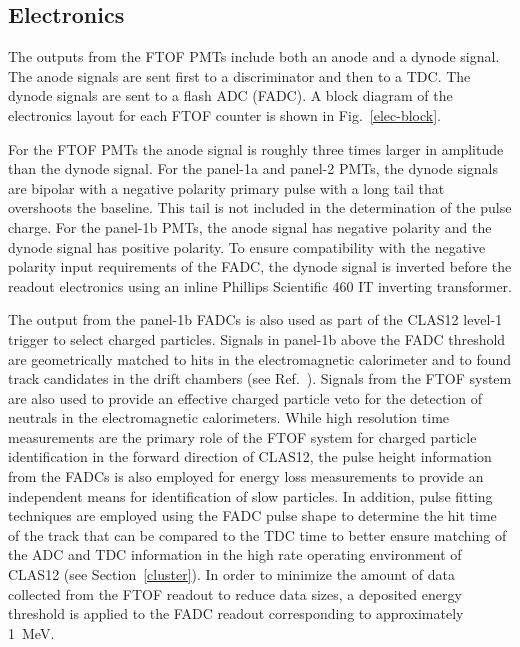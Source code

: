 \documentclass[3p,times,twocolumn]{elsarticle}
\begin{document}
\subsection{Electronics}
\label{sec-elec}

The outputs from the FTOF PMTs include both an anode and a dynode signal. The anode signals are sent
first to a discriminator and then to a TDC. The dynode signals are sent to a flash ADC (FADC). A block
diagram of the electronics layout for each FTOF counter is shown in Fig.~\ref{elec-block}.

For the FTOF PMTs the anode signal is roughly three times larger in amplitude than the dynode signal.
For the panel-1a and panel-2 PMTs, the dynode signals are bipolar with a negative polarity primary pulse
with a long tail that overshoots the baseline. This tail is not included in the determination of the pulse
charge. For the panel-1b PMTs, the anode signal has negative polarity and the dynode signal has positive
polarity. To ensure compatibility with the negative polarity input requirements of the FADC, the dynode
signal is inverted before the readout electronics using an inline Phillips Scientific 460 IT inverting
transformer.

The output from the panel-1b FADCs is also used as part of the CLAS12 level-1 trigger to select charged
particles. Signals in panel-1b above the FADC threshold are geometrically matched to hits in the
electromagnetic calorimeter and to found track candidates in the drift chambers (see Ref.~\cite{trigger-nim}).
Signals from the FTOF system are also used to provide an effective charged particle veto for the detection of
neutrals in the electromagnetic calorimeters. While high resolution time measurements are the primary role of
the FTOF system for charged particle identification in the forward direction of CLAS12, the pulse height
information from the FADCs is also employed for energy loss measurements to provide an independent
means for identification of slow particles. In addition, pulse fitting techniques are employed using the
FADC pulse shape to determine the hit time of the track that can be compared to the TDC time to better
ensure matching of the ADC and TDC information in the high rate operating environment of CLAS12 (see
Section~\ref{cluster}). In order to minimize the amount of data collected from the FTOF readout to reduce
data sizes, a deposited energy threshold is applied to the FADC readout corresponding to approximately 1~MeV.
\end{document}
